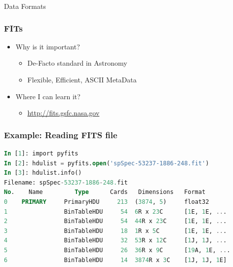 \documentclass[fleqn]{beamer}
\begin{document}

\begin{section}{Data Formats}

  \begin{frame}\frametitle{FITs}
  \begin{itemize}
    \item{Why is it important?}
      \begin{itemize}
      \item De-Facto standard in Astronomy
      \item Flexible, Efficient, ASCII MetaData
      \end{itemize}
    \item{Where I can learn it?}
      \begin{itemize}
      \item \url{http://fits.gsfc.nasa.gov}
      \end{itemize}
  \end{itemize}
  \end{frame}

\begin{frame}[containsverbatim]\frametitle{Example: Reading FITS file}
\begin{lstlisting}[language=SQL]
In [1]: import pyfits
In [2]: hdulist = pyfits.open('spSpec-53237-1886-248.fit')
In [3]: hdulist.info()
Filename: spSpec-53237-1886-248.fit
No.    Name         Type      Cards   Dimensions   Format
0    PRIMARY     PrimaryHDU     213  (3874, 5)     float32
1                BinTableHDU     54  6R x 23C      [1E, 1E, ...
2                BinTableHDU     54  44R x 23C     [1E, 1E, ...
3                BinTableHDU     18  1R x 5C       [1E, 1E, ...
4                BinTableHDU     32  53R x 12C     [1J, 1J, ...
5                BinTableHDU     26  36R x 9C      [19A, 1E, ...
6                BinTableHDU     14  3874R x 3C    [1J, 1J, 1E]
\end{lstlisting}
\end{frame}



\end{section}
\end{document}

